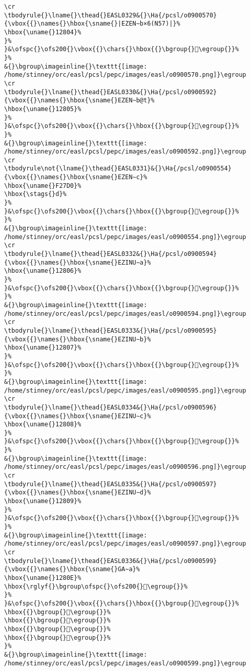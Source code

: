 \begin{verbatim}
\cr
\tbodyrule{}\lname{}\thead{}EASL0329&{}\Ha{/pcsl/o0900570}{\vbox{{}\names{}\hbox{\sname{}|EZEN∼b×6(N57)|}%
\hbox{\uname{}12804}%
}%
}&\ofspc{}\ofs200{}\vbox{{}\chars{}\hbox{{}\bgroup{}𒠄\egroup{}}%
}%
&{}\bgroup\imageinline{}\texttt{[image: /home/stinney/orc/easl/pcsl/pepc/images/easl/o0900570.png]}\egroup
\cr
\tbodyrule{}\lname{}\thead{}EASL0330&{}\Ha{/pcsl/o0900592}{\vbox{{}\names{}\hbox{\sname{}EZEN∼b@t}%
\hbox{\uname{}12805}%
}%
}&\ofspc{}\ofs200{}\vbox{{}\chars{}\hbox{{}\bgroup{}𒠅\egroup{}}%
}%
&{}\bgroup\imageinline{}\texttt{[image: /home/stinney/orc/easl/pcsl/pepc/images/easl/o0900592.png]}\egroup
\cr
\tbodyrule\not{\lname{}\thead{}EASL0331}&{}\Ha{/pcsl/o0900554}{\vbox{{}\names{}\hbox{\sname{}EZEN∼c}%
\hbox{\uname{}F27D0}%
\hbox{\stags{}d}%
}%
}&\ofspc{}\ofs200{}\vbox{{}\chars{}\hbox{{}\bgroup{}󲟐\egroup{}}%
}%
&{}\bgroup\imageinline{}\texttt{[image: /home/stinney/orc/easl/pcsl/pepc/images/easl/o0900554.png]}\egroup
\cr
\tbodyrule{}\lname{}\thead{}EASL0332&{}\Ha{/pcsl/o0900594}{\vbox{{}\names{}\hbox{\sname{}EZINU∼a}%
\hbox{\uname{}12806}%
}%
}&\ofspc{}\ofs200{}\vbox{{}\chars{}\hbox{{}\bgroup{}𒠆\egroup{}}%
}%
&{}\bgroup\imageinline{}\texttt{[image: /home/stinney/orc/easl/pcsl/pepc/images/easl/o0900594.png]}\egroup
\cr
\tbodyrule{}\lname{}\thead{}EASL0333&{}\Ha{/pcsl/o0900595}{\vbox{{}\names{}\hbox{\sname{}EZINU∼b}%
\hbox{\uname{}12807}%
}%
}&\ofspc{}\ofs200{}\vbox{{}\chars{}\hbox{{}\bgroup{}𒠇\egroup{}}%
}%
&{}\bgroup\imageinline{}\texttt{[image: /home/stinney/orc/easl/pcsl/pepc/images/easl/o0900595.png]}\egroup
\cr
\tbodyrule{}\lname{}\thead{}EASL0334&{}\Ha{/pcsl/o0900596}{\vbox{{}\names{}\hbox{\sname{}EZINU∼c}%
\hbox{\uname{}12808}%
}%
}&\ofspc{}\ofs200{}\vbox{{}\chars{}\hbox{{}\bgroup{}𒠈\egroup{}}%
}%
&{}\bgroup\imageinline{}\texttt{[image: /home/stinney/orc/easl/pcsl/pepc/images/easl/o0900596.png]}\egroup
\cr
\tbodyrule{}\lname{}\thead{}EASL0335&{}\Ha{/pcsl/o0900597}{\vbox{{}\names{}\hbox{\sname{}EZINU∼d}%
\hbox{\uname{}12809}%
}%
}&\ofspc{}\ofs200{}\vbox{{}\chars{}\hbox{{}\bgroup{}𒠉\egroup{}}%
}%
&{}\bgroup\imageinline{}\texttt{[image: /home/stinney/orc/easl/pcsl/pepc/images/easl/o0900597.png]}\egroup
\cr
\tbodyrule{}\lname{}\thead{}EASL0336&{}\Ha{/pcsl/o0900599}{\vbox{{}\names{}\hbox{\sname{}GA∼a}%
\hbox{\uname{}1280E}%
\hbox{\rglyf{}\bgroup\ofspc{}\ofs200{}𒠎\egroup{}}%
}%
}&\ofspc{}\ofs200{}\vbox{{}\chars{}\hbox{{}\bgroup{}𒠊\egroup{}}%
\hbox{{}\bgroup{}𒠋\egroup{}}%
\hbox{{}\bgroup{}𒠍\egroup{}}%
\hbox{{}\bgroup{}𒠎\egroup{}}%
\hbox{{}\bgroup{}𒠏\egroup{}}%
}%
&{}\bgroup\imageinline{}\texttt{[image: /home/stinney/orc/easl/pcsl/pepc/images/easl/o0900599.png]}\egroup

\end{verbatim}
